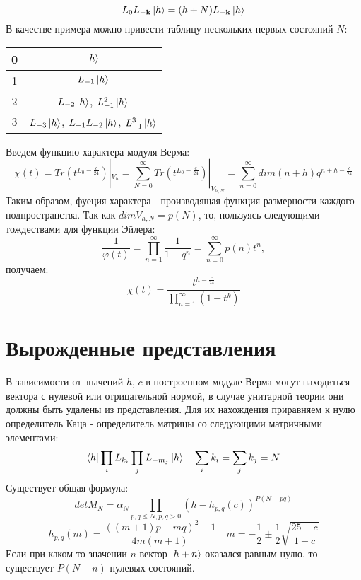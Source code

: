 \documentclass[12pt]{article}
\theoremstyle{definition}
\begin{document}
         \begin{equation}
 	   L_0L_{\bold{-k}}\ket{h}=(h+N)L_{\bold{-k}}\ket{h}
 	\end{equation}
  В качестве примера можно привести таблицу нескольких первых состояний $N$:
  	\begin{center}
			\begin{tabular}{|c|c|}
				\hline
      0 & $\ket{h}$         \\ \hline
				1 & $L_{-1}\ket{h}$         \\ \hline
    2 & $L_{-2}\ket{h}$, $L_{-1}^2\ket{h}$        \\ \hline
     3 & $L_{-3}\ket{h}$, $L_{-1}L_{-2}\ket{h}$, $L_{-1}^3\ket{h}$         \\ \hline
			\end{tabular}
\end{center}
Введем функцию характера модуля Верма:
           \begin{equation}
 	   \chi(t) = Tr(t^{L_0-\frac{c}{24}})|_{V_h}=\sum_{N=0}^{\infty}Tr(t^{L_0-\frac{c}{24}})|_{V_{h,N}}=\sum_{n=0}^{\infty}dim(n+h)q^{n+h-\frac{c}{24}}
 	\end{equation}
  Таким образом, фуеция характера - производящая функция размерности каждого подпространства. Так как $dim V_{h,N}=p(N)$, то, пользуясь следующими тождествами для функции Эйлера:
             \begin{equation}
 	  \frac{1}{\varphi(t)}=\prod_{n=1}^{\infty}\frac{1}{1-q^n}=\sum_{n=0}^{\infty}p(n)t^n,
 	\end{equation}
  получаем:
   \begin{equation}
 	  \chi(t) = \frac{t^{h-\frac{c}{24}}}{\prod_{n=1}^{\infty}(1-t^k)}
 	\end{equation}
  \section{Вырожденные представления}
  В зависимости от значений $h$, $c$ в построенном модуле Верма могут находиться вектора с нулевой или отрицательной нормой, в случае унитарной теории они должны быть удалены из представления. Для их нахождения приравняем к нулю определитель Каца - определитель матрицы со следующими матричными элементами: 
     \begin{equation}
 	  \bra{h}\prod_{i}L_{k_i}\prod_{j}L_{-m_j}\ket{h}\quad \sum_{i}k_i=\sum_{j}k_j=N
     \end{equation}
     Существует общая формула:
          \begin{equation}
 	  det M_N=\alpha_N\prod_{p,q\leq N, p,q> 0}(h-h_{p,q}(c))^{P(N-pq)}\end{equation} 
    \begin{equation*}
    h_{p,q}(m)=\frac{((m+1)p-mq)^2-1}{4m(m+1)} \quad m = -\frac{1}{2}\pm\frac{1}{2}\sqrt{\frac{25-c}{1-c}}
     \end{equation*}
     Если при каком-то значении $n$ вектор $\ket{h+n}$ оказался равным нулю, то существует $P(N-n)$ нулевых состояний.
     
\end{document}
